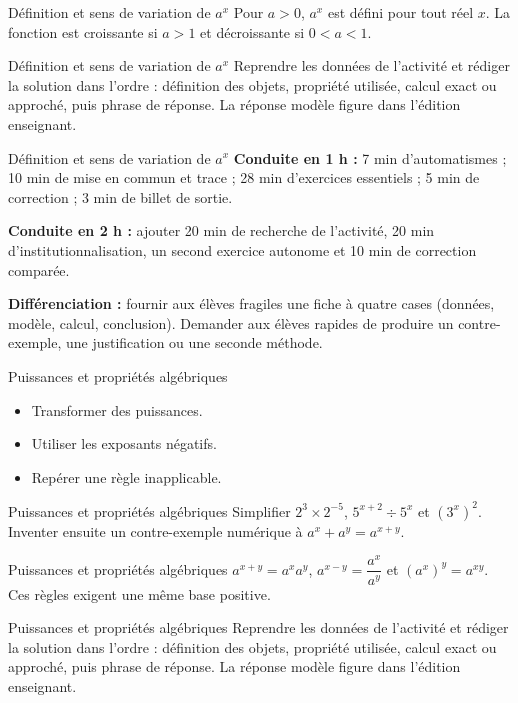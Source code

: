 \documentclass[aspectratio=169,10pt]{beamer}
\begin{document}
\begin{frame}{Définition et sens de variation de \(a^x\)}
Pour \(a>0\), \(a^x\) est défini pour tout réel \(x\). La fonction est croissante si \(a>1\) et décroissante si \(0<a<1\).
\end{frame}
\begin{frame}{Définition et sens de variation de \(a^x\)}
Reprendre les données de l'activité et rédiger la solution dans l'ordre : définition des objets, propriété utilisée, calcul exact ou approché, puis phrase de réponse. La réponse modèle figure dans l'édition enseignant.
\end{frame}
\begin{frame}{Définition et sens de variation de \(a^x\)}
\textbf{Conduite en 1 h :} 7 min d'automatismes ; 10 min de mise en commun et trace ; 28 min d'exercices essentiels ; 5 min de correction ; 3 min de billet de sortie.

\textbf{Conduite en 2 h :} ajouter 20 min de recherche de l'activité, 20 min d'institutionnalisation, un second exercice autonome et 10 min de correction comparée.

\textbf{Différenciation :} fournir aux élèves fragiles une fiche à quatre cases (données, modèle, calcul, conclusion). Demander aux élèves rapides de produire un contre-exemple, une justification ou une seconde méthode.
\end{frame}
\begin{frame}{Puissances et propriétés algébriques}
\begin{itemize}
\item Transformer des puissances.
\item Utiliser les exposants négatifs.
\item Repérer une règle inapplicable.

\end{itemize}
\end{frame}
\begin{frame}{Puissances et propriétés algébriques}
Simplifier \(2^3\times2^{-5}\), \(5^{x+2}\div5^x\) et \((3^x)^2\). Inventer ensuite un contre-exemple numérique à \(a^x+a^y=a^{x+y}\).
\end{frame}
\begin{frame}{Puissances et propriétés algébriques}
\(a^{x+y}=a^xa^y\), \(a^{x-y}=\dfrac{a^x}{a^y}\) et \((a^x)^y=a^{xy}\). Ces règles exigent une même base positive.
\end{frame}
\begin{frame}{Puissances et propriétés algébriques}
Reprendre les données de l'activité et rédiger la solution dans l'ordre : définition des objets, propriété utilisée, calcul exact ou approché, puis phrase de réponse. La réponse modèle figure dans l'édition enseignant.
\end{frame}
\end{document}
